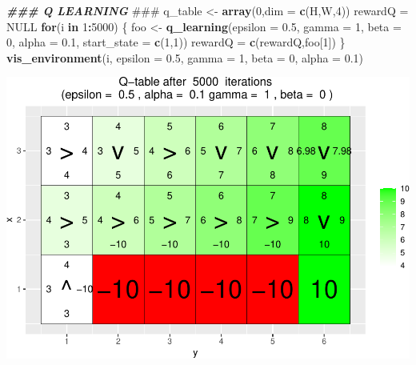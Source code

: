 \documentclass[
]{article}
\newenvironment{Shaded}{\begin{snugshade}}{\end{snugshade}}
\newcommand{\AlertTok}[1]{\textcolor[rgb]{0.94,0.16,0.16}{#1}}
\newcommand{\AttributeTok}[1]{\textcolor[rgb]{0.13,0.29,0.53}{#1}}
\newcommand{\ConstantTok}[1]{\textcolor[rgb]{0.56,0.35,0.01}{#1}}
\newcommand{\ControlFlowTok}[1]{\textcolor[rgb]{0.13,0.29,0.53}{\textbf{#1}}}
\newcommand{\DecValTok}[1]{\textcolor[rgb]{0.00,0.00,0.81}{#1}}
\newcommand{\DocumentationTok}[1]{\textcolor[rgb]{0.56,0.35,0.01}{\textbf{\textit{#1}}}}
\newcommand{\FloatTok}[1]{\textcolor[rgb]{0.00,0.00,0.81}{#1}}
\newcommand{\FunctionTok}[1]{\textcolor[rgb]{0.13,0.29,0.53}{\textbf{#1}}}
\newcommand{\NormalTok}[1]{#1}
\newcommand{\OtherTok}[1]{\textcolor[rgb]{0.56,0.35,0.01}{#1}}
\newcommand{\SpecialCharTok}[1]{\textcolor[rgb]{0.81,0.36,0.00}{\textbf{#1}}}
\begin{document}
\begin{Shaded}
\begin{Highlighting}[]
\DocumentationTok{\#\#\# Q LEARNING }\AlertTok{\#\#\#}
\NormalTok{q\_table }\OtherTok{\textless{}{-}} \FunctionTok{array}\NormalTok{(}\DecValTok{0}\NormalTok{,}\AttributeTok{dim =} \FunctionTok{c}\NormalTok{(H,W,}\DecValTok{4}\NormalTok{))}
\NormalTok{rewardQ }\OtherTok{=} \ConstantTok{NULL}
\ControlFlowTok{for}\NormalTok{(i }\ControlFlowTok{in} \DecValTok{1}\SpecialCharTok{:}\DecValTok{5000}\NormalTok{) \{}
\NormalTok{  foo }\OtherTok{\textless{}{-}} \FunctionTok{q\_learning}\NormalTok{(}\AttributeTok{epsilon =} \FloatTok{0.5}\NormalTok{, }\AttributeTok{gamma =} \DecValTok{1}\NormalTok{, }\AttributeTok{beta =} \DecValTok{0}\NormalTok{, }\AttributeTok{alpha =} \FloatTok{0.1}\NormalTok{, }\AttributeTok{start\_state =} \FunctionTok{c}\NormalTok{(}\DecValTok{1}\NormalTok{,}\DecValTok{1}\NormalTok{))}
\NormalTok{  rewardQ }\OtherTok{=} \FunctionTok{c}\NormalTok{(rewardQ,foo[}\DecValTok{1}\NormalTok{])}
\NormalTok{\}}
\FunctionTok{vis\_environment}\NormalTok{(i, }\AttributeTok{epsilon =} \FloatTok{0.5}\NormalTok{, }\AttributeTok{gamma =} \DecValTok{1}\NormalTok{, }\AttributeTok{beta =} \DecValTok{0}\NormalTok{, }\AttributeTok{alpha =} \FloatTok{0.1}\NormalTok{)}
\end{Highlighting}
\end{Shaded}

\includegraphics{jan2021_files/figure-latex/unnamed-chunk-3-1.pdf}
\end{document}
